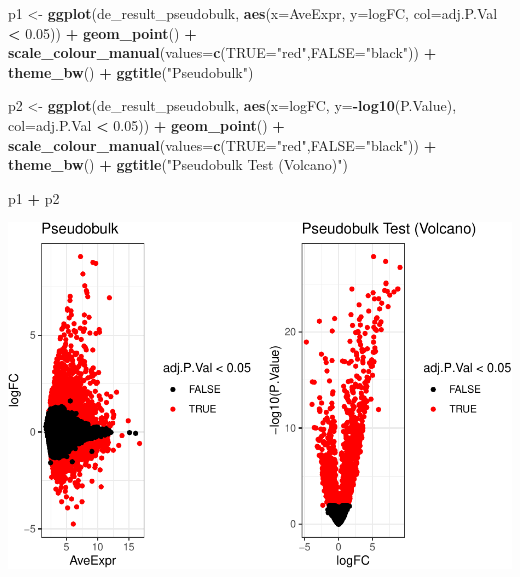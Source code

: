 \documentclass[
]{book}
\newenvironment{Shaded}{\begin{snugshade}}{\end{snugshade}}
\newcommand{\AttributeTok}[1]{\textcolor[rgb]{0.13,0.29,0.53}{#1}}
\newcommand{\FloatTok}[1]{\textcolor[rgb]{0.00,0.00,0.81}{#1}}
\newcommand{\FunctionTok}[1]{\textcolor[rgb]{0.13,0.29,0.53}{\textbf{#1}}}
\newcommand{\NormalTok}[1]{#1}
\newcommand{\OtherTok}[1]{\textcolor[rgb]{0.56,0.35,0.01}{#1}}
\newcommand{\SpecialCharTok}[1]{\textcolor[rgb]{0.81,0.36,0.00}{\textbf{#1}}}
\newcommand{\StringTok}[1]{\textcolor[rgb]{0.31,0.60,0.02}{#1}}
\begin{document}
\begin{Shaded}
\begin{Highlighting}[]
\NormalTok{p1 }\OtherTok{\textless{}{-}} \FunctionTok{ggplot}\NormalTok{(de\_result\_pseudobulk, }\FunctionTok{aes}\NormalTok{(}\AttributeTok{x=}\NormalTok{AveExpr, }\AttributeTok{y=}\NormalTok{logFC, }\AttributeTok{col=}\NormalTok{adj.P.Val }\SpecialCharTok{\textless{}} \FloatTok{0.05}\NormalTok{)) }\SpecialCharTok{+}
  \FunctionTok{geom\_point}\NormalTok{() }\SpecialCharTok{+}
  \FunctionTok{scale\_colour\_manual}\NormalTok{(}\AttributeTok{values=}\FunctionTok{c}\NormalTok{(}\StringTok{\textquotesingle{}TRUE\textquotesingle{}}\OtherTok{=}\StringTok{"red"}\NormalTok{,}\StringTok{\textquotesingle{}FALSE\textquotesingle{}}\OtherTok{=}\StringTok{"black"}\NormalTok{)) }\SpecialCharTok{+} 
  \FunctionTok{theme\_bw}\NormalTok{() }\SpecialCharTok{+}
  \FunctionTok{ggtitle}\NormalTok{(}\StringTok{"Pseudobulk"}\NormalTok{)}


\NormalTok{p2 }\OtherTok{\textless{}{-}} \FunctionTok{ggplot}\NormalTok{(de\_result\_pseudobulk, }\FunctionTok{aes}\NormalTok{(}\AttributeTok{x=}\NormalTok{logFC, }\AttributeTok{y=}\SpecialCharTok{{-}}\FunctionTok{log10}\NormalTok{(P.Value), }\AttributeTok{col=}\NormalTok{adj.P.Val }\SpecialCharTok{\textless{}} \FloatTok{0.05}\NormalTok{)) }\SpecialCharTok{+}
  \FunctionTok{geom\_point}\NormalTok{() }\SpecialCharTok{+}
  \FunctionTok{scale\_colour\_manual}\NormalTok{(}\AttributeTok{values=}\FunctionTok{c}\NormalTok{(}\StringTok{\textquotesingle{}TRUE\textquotesingle{}}\OtherTok{=}\StringTok{"red"}\NormalTok{,}\StringTok{\textquotesingle{}FALSE\textquotesingle{}}\OtherTok{=}\StringTok{"black"}\NormalTok{)) }\SpecialCharTok{+} 
  \FunctionTok{theme\_bw}\NormalTok{() }\SpecialCharTok{+}
  \FunctionTok{ggtitle}\NormalTok{(}\StringTok{"Pseudobulk Test (Volcano)"}\NormalTok{)}

\NormalTok{p1 }\SpecialCharTok{+}\NormalTok{ p2}
\end{Highlighting}
\end{Shaded}

\includegraphics{scRNAseqInR_Doco_files/figure-latex/unnamed-chunk-61-1.pdf}
\end{document}
